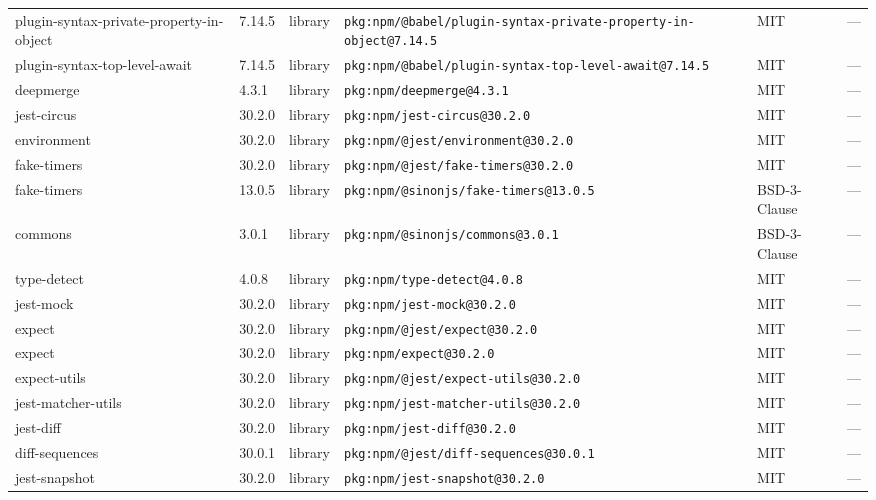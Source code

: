 \documentclass[11pt,a4paper]{article}
\begin{document}
\begin{longtable}{|p{4cm}|p{2cm}|p{1.6cm}|p{5cm}|p{1.5cm}|p{3.5cm}|}
\raggedright plugin-syntax-private-property-in-object & 7.14.5 & library & \small\texttt{pkg:npm/@babel/plugin-syntax-private-property-in-object@7.14.5} & MIT & \small — \\
\raggedright plugin-syntax-top-level-await & 7.14.5 & library & \small\texttt{pkg:npm/@babel/plugin-syntax-top-level-await@7.14.5} & MIT & \small — \\
\raggedright deepmerge & 4.3.1 & library & \small\texttt{pkg:npm/deepmerge@4.3.1} & MIT & \small — \\
\raggedright jest-circus & 30.2.0 & library & \small\texttt{pkg:npm/jest-circus@30.2.0} & MIT & \small — \\
\raggedright environment & 30.2.0 & library & \small\texttt{pkg:npm/@jest/environment@30.2.0} & MIT & \small — \\
\raggedright fake-timers & 30.2.0 & library & \small\texttt{pkg:npm/@jest/fake-timers@30.2.0} & MIT & \small — \\
\raggedright fake-timers & 13.0.5 & library & \small\texttt{pkg:npm/@sinonjs/fake-timers@13.0.5} & BSD-3-Clause & \small — \\
\raggedright commons & 3.0.1 & library & \small\texttt{pkg:npm/@sinonjs/commons@3.0.1} & BSD-3-Clause & \small — \\
\raggedright type-detect & 4.0.8 & library & \small\texttt{pkg:npm/type-detect@4.0.8} & MIT & \small — \\
\raggedright jest-mock & 30.2.0 & library & \small\texttt{pkg:npm/jest-mock@30.2.0} & MIT & \small — \\
\raggedright expect & 30.2.0 & library & \small\texttt{pkg:npm/@jest/expect@30.2.0} & MIT & \small — \\
\raggedright expect & 30.2.0 & library & \small\texttt{pkg:npm/expect@30.2.0} & MIT & \small — \\
\raggedright expect-utils & 30.2.0 & library & \small\texttt{pkg:npm/@jest/expect-utils@30.2.0} & MIT & \small — \\
\raggedright jest-matcher-utils & 30.2.0 & library & \small\texttt{pkg:npm/jest-matcher-utils@30.2.0} & MIT & \small — \\
\raggedright jest-diff & 30.2.0 & library & \small\texttt{pkg:npm/jest-diff@30.2.0} & MIT & \small — \\
\raggedright diff-sequences & 30.0.1 & library & \small\texttt{pkg:npm/@jest/diff-sequences@30.0.1} & MIT & \small — \\
\raggedright jest-snapshot & 30.2.0 & library & \small\texttt{pkg:npm/jest-snapshot@30.2.0} & MIT & \small — \\

\end{longtable}
\end{document}
